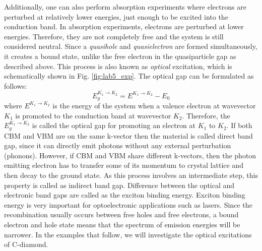 Additionally, one can also perform absorption experiments where electrons are perturbed at relatively lower energies, just enough to be excited into the conduction band. 
In absorption experiments,  electrons are perturbed at lower energies. 
Therefore, they are not completely free and the system is still considered neutral. 
Since a \textit{quasihole} and \textit{quasielectron} are formed simultaneously, it creates a bound state, unlike the free electron in the quasiparticle gap as described above. 
This process is also known as \textit{optical} excitation, which is schematically  shown in Fig. \ref{fig:lab5_exp}. 
The optical gap can be formulated as follows:
\begin{equation}
E_g^{K_1 {\rightarrow} K_2}=E^{K_1 {\rightarrow} K_2}- E_{0}\label{eq:optical}
\end{equation}
where $E^{K_1 {\rightarrow} K_2}$ is the energy of the system when a valence electron at wavevector $K_1$ is promoted to the conduction band at wavevector $K_2$. 
Therefore, the $E_g^{K_1 {\rightarrow} K_2}$ is called the optical gap for promoting an electron at $K_1$ to $K_2$.
If both CBM and VBM are on the same k-vector then the material is called direct band gap, since it can directly emit photons without any external perturbation (phonons). 
However, if CBM and VBM share different k-vectors, then the photon emitting electron has to transfer some of its momentum to crystal lattice and then decay to the ground state. 
As this process involves an intermediate step, this property is called as indirect band gap. 
Difference between the optical and electronic band gaps are called as the exciton binding energy. 
Exciton binding energy is very important for optoelectronic applications such as lasers. 
Since the recombination usually occurs between free holes and free electrons, a bound electron and hole state means that the spectrum of emission energies will be narrower. 
In the examples that follow, we will investigate the optical excitations of C-diamond.

